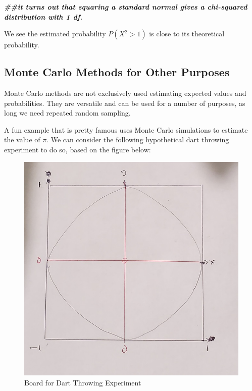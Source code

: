 \documentclass[
]{book}
\newenvironment{Shaded}{\begin{snugshade}}{\end{snugshade}}
\newcommand{\DocumentationTok}[1]{\textcolor[rgb]{0.56,0.35,0.01}{\textbf{\textit{#1}}}}
\begin{document}
\begin{Shaded}
\begin{Highlighting}[]
\DocumentationTok{\#\#it turns out that squaring a standard normal gives a chi{-}squared distribution with 1 df.}
\end{Highlighting}
\end{Shaded}

We see the estimated probability \(P(X^2 > 1)\) is close to its theoretical probability.

\subsection{Monte Carlo Methods for Other Purposes}\label{monte-carlo-methods-for-other-purposes}

Monte Carlo methods are not exclusively used estimating expected values and probabilities. They are versatile and can be used for a number of purposes, as long we need repeated random sampling.

A fun example that is pretty famous uses Monte Carlo simulations to estimate the value of \(\pi\). We can consider the following hypothetical dart throwing experiment to do so, based on the figure below:

\begin{figure}
\centering
\includegraphics{images/06-circle.jpg}
\caption{\label{fig:circle}Board for Dart Throwing Experiment}
\end{figure}
\end{document}
